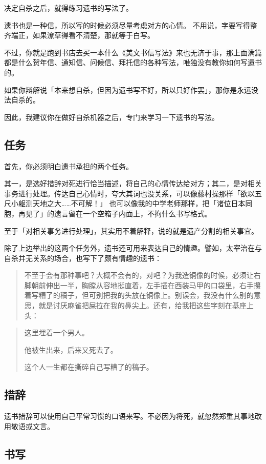 \documentclass[UTF8]{ctexart}
\begin{document}
决定自杀之后，就得练习遗书的写法了。

遗书也是一种信，所以写的时候必须尽量考虑对方的心情。
不用说，字要写得整齐端正，如果潦草得看不清楚，那就等于白写。

不过，你就是跑到书店去买一本什么《美文书信写法》来也无济于事，那上面满篇都是什么贺年信、通知信、问候信、拜托信的各种写法，唯独没有教你如何写遗书的。

如果你辩解说「本来想自杀，但因为遗书写不好，所以只好作罢」，那你是永远没法自杀的。

因此，我建议你在做好自杀机器之后，专门来学习一下遗书的写法。

\subsection{任务}
首先，你必须明白遗书承担的两个任务。

其一，是选好措辞对死进行恰当描述，将自己的心情传达给对方；其二，是对相关事务进行处理。传达自己心情时，夸大其词也没关系，可以像藤村操那样「欲以五尺小躯测天地之大……不可解！」
也可以像我的中学老师那样，把「诸位日本同胞，再见了」的遗言留在一个空箱子内面上，不拘什么书写格式。

至于「对相关事务进行处理」，其实用不着解释，说的就是遗产分割的相关事宜。

除了上边举出的这两个任务外，遗书还可用来表达自己的情趣。譬如，太宰治在与自杀并无关系的场合，也写下了颇有情趣的遗书：

\begin{quotation}
不至于会有那种事吧？大概不会有的，对吧？为我造铜像的时候，必须让右脚朝前伸出一半，胸膛从容地挺直着，左手插在西装马甲的口袋里，右手攥着写糟了的稿子，但可别把我的头放在铜像上。别误会，我没有什么别的意思，就是讨厌麻雀把屎拉在我的鼻尖上。还有，给我把这些字刻在基座上头：
\end{quotation}

\begin{verse}
这里埋着一个男人。

他被生出来，后来又死去了。

这个人一生都在撕碎自己写糟了的稿子。
\end{verse}

\subsection{措辞}

遗书措辞可以使用自己平常习惯的口语来写。不必因为将死，就忽然郑重其事地改用敬语或文言。

\subsection{书写}
\end{document}
